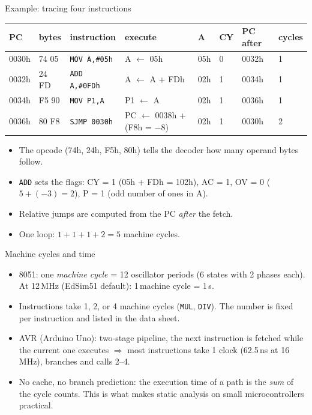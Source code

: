 \begin{frame}{Example: tracing four instructions}
  \footnotesize
  \begin{tabular}{@{}llllllll@{}}
    \toprule
    PC & bytes & instruction & execute & A & CY & PC after & cycles \\
    \midrule
    0030h & 74 05 & \texttt{MOV A,\#05h}  & A $\leftarrow$ 05h & 05h & 0 & 0032h & 1 \\
    0032h & 24 FD & \texttt{ADD A,\#0FDh} & A $\leftarrow$ A + FDh & 02h & 1 & 0034h & 1 \\
    0034h & F5 90 & \texttt{MOV P1,A}     & P1 $\leftarrow$ A & 02h & 1 & 0036h & 1 \\
    0036h & 80 F8 & \texttt{SJMP 0030h}   & PC $\leftarrow$ 0038h + (F8h = $-8$) & 02h & 1 & 0030h & 2 \\
    \bottomrule
  \end{tabular}
  \medskip
  \begin{itemize}
    \item The opcode (74h, 24h, F5h, 80h) tells the decoder how many operand bytes follow.
    \item \texttt{ADD} sets the flags: CY = 1 (05h + FDh = 102h), AC = 1, OV = 0 ($5 + (-3) = 2$), P = 1 (odd number of ones in A).
    \item Relative jumps are computed from the PC \emph{after} the fetch.
    \item One loop: $1+1+1+2 = 5$ machine cycles.
  \end{itemize}
\end{frame}


\begin{frame}{Machine cycles and time}
  \begin{itemize}
    \item 8051: one \emph{machine cycle} = 12 oscillator periods (6 states with 2 phases each). At 12\,MHz (EdSim51 default): 1\,machine cycle = 1\,\textmu s.
    \item Instructions take 1, 2, or 4 machine cycles (\texttt{MUL}, \texttt{DIV}). The number is fixed per instruction and listed in the data sheet.
    \item AVR (Arduino Uno): two-stage pipeline, the next instruction is fetched while the current one executes $\Rightarrow$ most instructions take 1 clock (62.5\,ns at 16\,MHz), branches and calls 2--4.
    \item No cache, no branch prediction: the execution time of a path is the \emph{sum} of the cycle counts. This is what makes static analysis on small microcontrollers practical.
  \end{itemize}
\end{frame}

